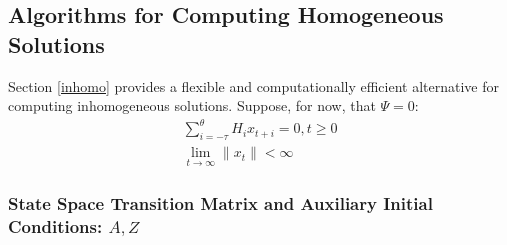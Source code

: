 \documentclass[12pt]{article}
\begin{document}




%   







\subsection{Algorithms for Computing Homogeneous Solutions }
\label{sec:homo}



Section \ref{inhomo} provides a flexible 
and computationally efficient alternative for 
computing inhomogeneous solutions.
Suppose, for now, that $\Psi=0$:
\begin{gather}
\sum_{i= - \tau}^\theta{ H_i  x_{ t + i } }= 0, t \geq0\label{eq:homo}\\
\lim_{ t \rightarrow\infty} \|x_t\|   < \infty%
\end{gather}








\subsubsection{State Space Transition Matrix and Auxiliary Initial Conditions: $A, Z$}
\label{sec:arzgev}
\end{document}
